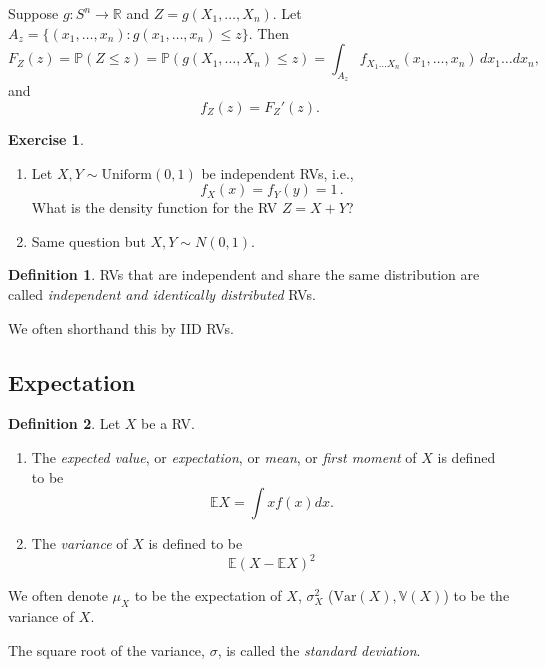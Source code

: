 \documentclass[
  openany]{book}
\theoremstyle{definition}
\newtheorem{definition}{Definition}[chapter]
\theoremstyle{definition}
\theoremstyle{definition}
\newtheorem{exercise}{Exercise}[chapter]
\theoremstyle{definition}
\theoremstyle{remark}
\begin{document}
Suppose \(g: S^n \to \mathbb{R}\) and \(Z = g(X_1, \dots, X_n)\).
Let \(A_z = \{ (x_1,\dots, x_n): g(x_1,\dots, x_n) \leq z \}\).
Then
\[F_Z(z) = \mathbb{P}(Z \leq z) = \mathbb{P}(g(X_1, \dots, X_n) \leq z) = \int_{A_z} f_{X_1\dots X_n}(x_1,\dots,x_n) \, dx_1\dots dx_n, \]
and
\[f_Z(z) = F_Z'(z).\]

\begin{exercise}
\leavevmode

\begin{enumerate}
\def\labelenumi{\arabic{enumi}.}
\item
  Let \(X, Y \sim \text{Uniform}(0,1)\) be independent RVs, i.e.,
  \[f_{X}(x) = f_{Y}(y) = 1\,.\]
  What is the density function for the RV \(Z = X + Y\)?
\item
  Same question but \(X, Y \sim N(0,1)\).
\end{enumerate}

\end{exercise}

\begin{definition}
RVs that are independent and share the same distribution are called
\emph{independent and identically distributed} RVs.

We often shorthand this by IID RVs.
\end{definition}

\hypertarget{expectation}{%
\subsection{Expectation}\label{expectation}}

\begin{definition}
Let \(X\) be a RV.

\begin{enumerate}
\def\labelenumi{\arabic{enumi}.}
\item
  The \emph{expected value}, or \emph{expectation}, or \emph{mean}, or \emph{first moment} of \(X\) is defined to be
  \[ \mathbb{E}X = \int x f(x)  dx. \]
\item
  The \emph{variance} of \(X\) is defined to be
  \[\mathbb{E}\left( X - \mathbb{E}X \right)^2\]
\end{enumerate}

We often denote \(\mu_X\) to be the expectation of \(X\), \(\sigma_X^2\) (\(\mathrm{Var}(X), \mathbb{V}(X)\)) to be the variance of \(X\).

The square root of the variance, \(\sigma\), is called the \emph{standard deviation}.
\end{definition}
\end{document}
